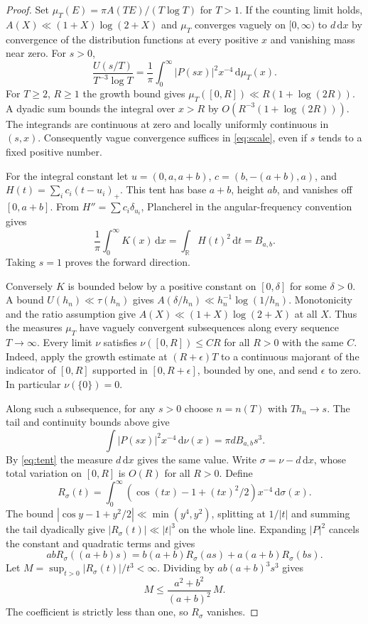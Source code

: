 \documentclass[11pt]{article}
\newcommand{\R}{\mathbb R}
\newcommand{\dd}{\,\mathrm d}
\begin{document}
\begin{proof}
Set $\mu_T(E)=\pi A(TE)/(T\log T)$ for $T>1$. If the counting limit holds, $A(X)\ll(1+X)\log(2+X)$ and $\mu_T$ converges vaguely on $[0,\infty)$ to $d\,\mathrm dx$ by convergence of the distribution functions at every positive $x$ and vanishing mass near zero. For $s>0$,
\begin{equation}\label{eq:scale}
 \frac{U(s/T)}{T^{-3}\log T}
  =\frac1\pi\int_0^\infty |P(sx)|^2x^{-4}\dd\mu_T(x).
\end{equation}
For $T\ge2$, $R\ge1$ the growth bound gives $\mu_T([0,R])\ll R(1+\log(2R))$. A dyadic sum bounds the integral over $x>R$ by $O(R^{-3}(1+\log(2R)))$. The integrands are continuous at zero and locally uniformly continuous in $(s,x)$. Consequently vague convergence suffices in \eqref{eq:scale}, even if $s$ tends to a fixed positive number.

For the integral constant let $u=(0,a,a+b)$, $c=(b,-(a+b),a)$, and $H(t)=\sum_i c_i(t-u_i)_+$. This tent has base $a+b$, height $ab$, and vanishes off $[0,a+b]$. From $H''=\sum c_i\delta_{u_i}$, Plancherel in the angular-frequency convention gives
\begin{equation}\label{eq:tent}
 \frac1\pi\int_0^\infty K(x)\dd x=\int_{\R}H(t)^2\dd t=B_{a,b}.
\end{equation}
Taking $s=1$ proves the forward direction.

Conversely $K$ is bounded below by a positive constant on $[0,\delta]$ for some $\delta>0$. A bound $U(h_n)\ll\tau(h_n)$ gives $A(\delta/h_n)\ll h_n^{-1}\log(1/h_n)$. Monotonicity and the ratio assumption give $A(X)\ll (1+X)\log(2+X)$ at all $X$. Thus the measures $\mu_T$ have vaguely convergent subsequences along every sequence $T\to\infty$. Every limit $\nu$ satisfies $\nu([0,R])\le C R$ for all $R>0$ with the same $C$. Indeed, apply the growth estimate at $(R+\epsilon)T$ to a continuous majorant of the indicator of $[0,R]$ supported in $[0,R+\epsilon]$, bounded by one, and send $\epsilon$ to zero. In particular $\nu(\{0\})=0$.

Along such a subsequence, for any $s>0$ choose $n=n(T)$ with $T h_n\to s$. The tail and continuity bounds above give
\[
 \int |P(sx)|^2x^{-4}\dd\nu(x)=\pi d B_{a,b}s^3 .
\]
By \eqref{eq:tent} the measure $d\,\mathrm dx$ gives the same value. Write $\sigma=\nu-d\,\mathrm dx$, whose total variation on $[0,R]$ is $O(R)$ for all $R>0$. Define
\[
 R_\sigma(t)=\int_0^\infty (\cos(tx)-1+(tx)^2/2)x^{-4}\dd\sigma(x).
\]
The bound $|\cos y-1+y^2/2|\ll\min(y^4,y^2)$, splitting at $1/|t|$ and summing the tail dyadically give $|R_\sigma(t)|\ll|t|^3$ on the whole line. Expanding $|P|^2$ cancels the constant and quadratic terms and gives
\[
 ab R_\sigma((a+b)s)=b(a+b)R_\sigma(as)+a(a+b)R_\sigma(bs).
\]
Let $M=\sup_{t>0}|R_\sigma(t)|/t^3<\infty$. Dividing by $ab(a+b)^3s^3$ gives
\[
 M\le \frac{a^2+b^2}{(a+b)^2}\,M.
\]
The coefficient is strictly less than one, so $R_\sigma$ vanishes.


\end{proof}
\end{document}
